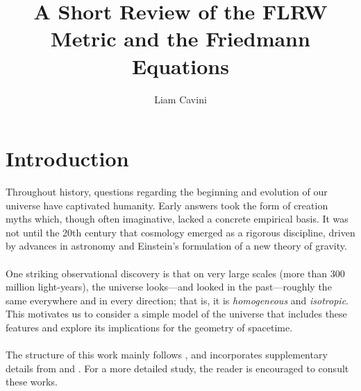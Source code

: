 \documentclass[12pt,letterpaper]{article}         %
\newcommand\para{\paragraph{}}
\begin{document}

\title{\boldmath A Short Review of the FLRW Metric and the Friedmann Equations}

\author{Liam Cavini}


\maketitle
\flushbottom

\section{Introduction}
Throughout history, questions regarding the beginning and evolution of our universe have captivated humanity. Early answers took the form of creation myths which, though often imaginative, lacked a concrete empirical basis.
It was not until the 20th century that cosmology emerged as a rigorous discipline, driven by advances in astronomy and Einstein's formulation of a new theory of gravity.
\para
One striking observational discovery is that on very large scales (more than 300 million light-years), the universe looks—and looked in the past—roughly the same everywhere and in every direction; that is, it is \emph{homogeneous} and \emph{isotropic}. 
This motivates us to consider a simple model of the universe that includes these features and explore its implications for the geometry of spacetime.
\para 
The structure of this work mainly follows \cite{casadio-notes}, and incorporates supplementary details from \cite{wald-relativity} and \cite{carroll-spacetime}. For a more detailed study, the reader is encouraged to consult these works.
\end{document}
